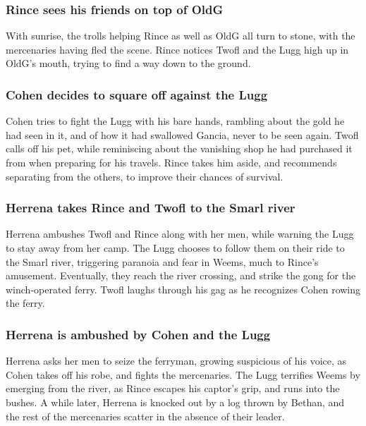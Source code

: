 \subsubsection{\Gls{Rince} sees his friends on top of \Gls{OldG}}
With sunrise, the trolls helping \Gls{Rince} as well as \Gls{OldG} all turn to stone, with the
mercenaries having fled the scene. \Gls{Rince} notices \Gls{Twofl} and the \Gls{Lugg} high up in
\Gls{OldG}'s mouth, trying to find a way down to the ground.

\subsubsection{\Gls{Cohen} decides to square off against the \Gls{Lugg}}
\Gls{Cohen} tries to fight the \Gls{Lugg} with his bare hands, rambling about the gold he had seen
in it, and of how it had swallowed \Gls{Gancia}, never to be seen again. \Gls{Twofl} calls off his
pet, while reminiscing about the vanishing shop he had purchased it from when preparing for his
travels. \Gls{Rince} takes him aside, and recommends separating from the others, to improve their
chances of survival.

\subsubsection{\Gls{Herrena} takes \Gls{Rince} and \Gls{Twofl} to the Smarl river}
\Gls{Herrena} ambushes \Gls{Twofl} and \Gls{Rince} along with her men, while warning the \Gls{Lugg}
to stay away from her camp. The \Gls{Lugg} chooses to follow them on their ride to the Smarl river,
triggering paranoia and fear in \Gls{Weems}, much to \Gls{Rince}'s amusement. Eventually, they
reach the river crossing, and strike the gong for the winch-operated ferry. \Gls{Twofl} laughs
through his gag as he recognizes \Gls{Cohen} rowing the ferry.

\subsubsection{\Gls{Herrena} is ambushed by \Gls{Cohen} and the \Gls{Lugg}}
\Gls{Herrena} asks her men to seize the ferryman, growing suspicious of his voice, as \Gls{Cohen}
takes off his robe, and fights the mercenaries. The \Gls{Lugg} terrifies \Gls{Weems} by emerging
from the river, as \Gls{Rince} escapes his captor's grip, and runs into the bushes. A while later,
\Gls{Herrena} is knocked out by a log thrown by \Gls{Bethan}, and the rest of the mercenaries
scatter in the absence of their leader.

